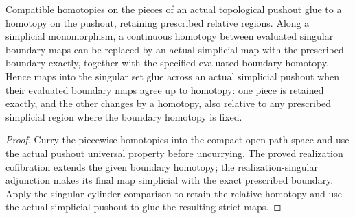 \begin{proposition}
  \label{prop:actual-singular-relative-pushout-gluing}
  \leanok
  Compatible homotopies on the pieces of an actual topological pushout glue to a homotopy on the pushout, retaining prescribed relative regions. Along a simplicial monomorphism, a continuous homotopy between evaluated singular boundary maps can be replaced by an actual simplicial map with the prescribed boundary exactly, together with the specified evaluated boundary homotopy. Hence maps into the singular set glue across an actual simplicial pushout when their evaluated boundary maps agree up to homotopy: one piece is retained exactly, and the other changes by a homotopy, also relative to any prescribed simplicial region where the boundary homotopy is fixed.
\end{proposition}
\begin{proof}
  Curry the piecewise homotopies into the compact-open path space and use the actual pushout universal property before uncurrying. The proved realization cofibration extends the given boundary homotopy; the realization-singular adjunction makes its final map simplicial with the exact prescribed boundary. Apply the singular-cylinder comparison to retain the relative homotopy and use the actual simplicial pushout to glue the resulting strict maps.
  \leanok
\end{proof}

